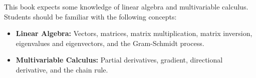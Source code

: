 \documentclass[../main/main]{subfiles}
\begin{document}
    

This book expects some knowledge of linear algebra and multivariable calculus.
Students should be familiar with the following concepts:
\begin{itemize}
    \item \textbf{Linear Algebra:} Vectors, matrices, matrix multiplication, matrix inversion, eigenvalues and eigenvectors, and the Gram-Schmidt process.
    \item \textbf{Multivariable Calculus:} Partial derivatives, gradient, directional derivative, and the chain rule.
\end{itemize}
\end{document}
